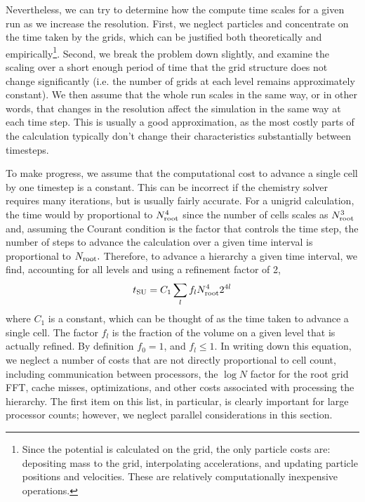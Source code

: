 Nevertheless, we can try to determine how the compute time scales for
a given run as we increase the resolution.  First, we neglect
particles and concentrate on the time taken by the grids, which can be
justified both theoretically and empirically\footnote{Since the
potential is calculated on the grid, the only particle costs are:
depositing mass to the grid, interpolating accelerations, and updating
particle positions and velocities.  These are relatively
computationally inexpensive operations.}.  Second, we break the
problem down slightly, and examine the scaling over a short enough
period of time that the grid structure does not change significantly
(i.e. the number of grids at each level remains approximately
constant).  We then assume that the whole run scales in the same way,
or in other words, that changes in the resolution affect the
simulation in the same way at each time step.  This is usually a good
approximation, as the most costly parts of the calculation typically
don't change their characteristics substantially between timesteps.

To make progress, we assume that the computational cost to advance a
single cell by one timestep is a constant.  This can be incorrect if
the chemistry solver requires many iterations, but is usually fairly
accurate.  For a unigrid calculation, the time would by proportional
to $N_{\rm root}^4$ since the number of cells scales as $N_{\rm
root}^3$ and, assuming the Courant condition is the 
factor that controls the time step, the number of steps to advance the
calculation over a given time interval is
proportional to $N_{\rm root}.$ Therefore, to advance a hierarchy a
given time interval, we find, accounting for all levels and using a refinement
factor of 2,
\begin{equation} t_{\rm SU} = C_1 \sum_l f_l N_{\rm root}^4 2^{4l}
\end{equation} where $C_1$ is a constant, which can be thought of as
the time taken to advance a single cell.  The factor $f_l$ is the
fraction of the volume on a given level that is actually refined.  By
definition $f_0 = 1$, and $f_l \le 1$.  In writing down this equation,
we neglect a number of costs that are not directly proportional to
cell count, including communication between processors, the $\log{N}$
factor for the root grid FFT, cache misses, optimizations, and other
costs associated with processing the hierarchy.  The first item on
this list, in particular, is clearly important for large processor
counts; however, we neglect parallel considerations in this section.

